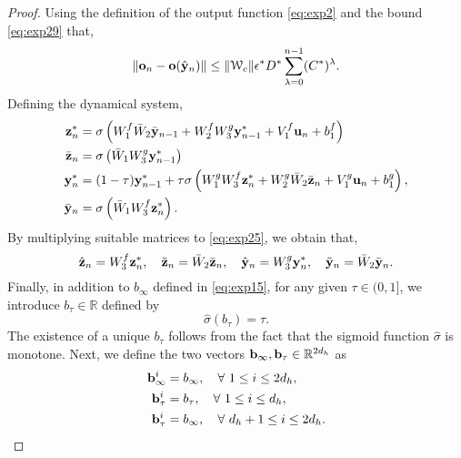 \documentclass{article} \usepackage{iclr2022_conference,times}
\newcommand{\by}{{\bf y}}
\newcommand{\bz}{{\bf z}}
\newcommand{\bu}{{\bf u}}
\newcommand{\bb}{{\bf b}}
\newcommand{\bo}{{\bf o}}
\newcommand{\R}{{\mathbb R}}
\newcommand{\cW}{\EuScript{W}}
\begin{document}
\begin{proof}
Using the definition of the output function \eqref{eq:exp2} and the bound \eqref{eq:exp29} that, 
\begin{equation}
    \label{eq:exp210}
    \|\bo_n -\bo(\hat{\by}_n)\| \leq \|\cW_c\| \epsilon^{\ast}D^{\ast}\sum_{\lambda=0}^{n-1}(C^{\ast})^{\lambda}.
\end{equation}
Defining the dynamical system,
\begin{equation}
    \label{eq:exp211}
    \begin{aligned}
    \bz^{\ast}_n &= \sigma\left(W^f_1 \bar{W}_2 \bar{\by}_{n-1} + W^f_2 W^g_3 \by^{\ast}_{n-1} + V^f_1 \bu_n + b^f_1 \right) \\
    \bar{\bz}_n &= \sigma\left(\bar{W}_1 W^g_3\by^{\ast}_{n-1} \right) \\
    \by^{\ast}_n &= (1-\tau)\by^{\ast}_{n-1} +\tau \sigma\left(W^g_1 W^f_3 \bz^{\ast}_{n} + W^g_2 \bar{W}_2 \bar{\bz}_{n} + V^g_1 \bu_n + b^g_1 \right), \\
    \bar{\by}_n &= \sigma\left(\bar{W}_1 W^f_3 \bz^{\ast}_{n} \right) .
    \end{aligned}
\end{equation}
By multiplying suitable matrices to \eqref{eq:exp25}, we obtain that,
\begin{equation}
    \label{eq:exp212}
    \hat{\bz}_n = W^f_3\bz_n^{\ast}, \quad 
    \tilde{\bz}_n = \bar{W}_2 \bar{\bz}_n, \quad 
    \hat{\by}_n = W^g_3\by_n^{\ast}, \quad 
    \tilde{\by}_n = \bar{W}_2 \bar{\by}_n.
\end{equation}
Finally, in addition to $b_{\infty}$ defined in \eqref{eq:exp15}, for any given $\tau \in (0,1]$, we introduce $b_{\tau} \in \R$ defined by 
\begin{equation}
    \label{eq:exp213}
    \hat{\sigma}(b_{\tau}) = \tau.
\end{equation}
The existence of a unique $b_{\tau}$ follows from the fact that the sigmoid function $\hat{\sigma}$ is monotone. Next, we define the two vectors $\bb_{\infty},\bb_{\tau} \in \R^{2d_h}$ as
\begin{equation}
\label{eq:exp215}
\begin{aligned}
\bb_{\infty}^i &= b_{\infty}, \quad \forall~1 \leq i \leq 2d_h, \\
\bb_{\tau}^i &= b_{\tau}, \quad \forall~ 1 \leq i \leq d_h, \\
\bb_{\tau}^i &= b_{\infty}, \quad \forall~ d_h+1 \leq i \leq 2d_h . \\
\end{aligned}
\end{equation}


\end{proof}
\end{document}
